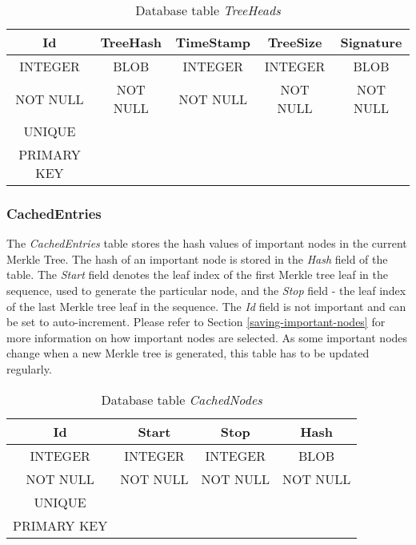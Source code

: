 \documentclass{article}
\begin{document}
	\begin{table}[H]
		\centering
		\caption{Database table \textit{TreeHeads}}
		\label{treeHeadsDbTable1}
		\begin{tabular}{|c|c|c|c|c|} \hline
			\textbf{Id}	& \textbf{TreeHash}  & \textbf{TimeStamp} & \textbf{TreeSize} & \textbf{Signature} \\ \hline
			INTEGER & BLOB & INTEGER & INTEGER & BLOB \\ \hline
			NOT NULL & NOT NULL & NOT NULL & NOT NULL & NOT NULL \\
			UNIQUE & & & & \\
			PRIMARY KEY & & & & \\ \hline
		\end{tabular}
	\end{table}

	\subsubsection{CachedEntries}
	
	The \textit{CachedEntries} table stores the hash values of important nodes in the current Merkle Tree. The hash of an important node is stored in the \textit{Hash} field of the table. The \textit{Start} field denotes the leaf index of the first Merkle tree leaf in the sequence, used to generate the particular node, and the \textit{Stop} field - the leaf index of the last Merkle tree leaf in the sequence. The \textit{Id} field is not important and can be set to auto-increment. Please refer to Section \ref{saving-important-nodes} for more information on how important nodes are selected. As some important nodes change when a new Merkle tree is generated, this table has to be updated regularly.

	\begin{table}[H]
		\centering
		\caption{Database table \textit{CachedNodes}}
		\label{cachedNodesDbTable1}
		\begin{tabular}{|c|c|c|c|} \hline
			\textbf{Id}	& \textbf{Start}  & \textbf{Stop} & \textbf{Hash} \\ \hline
			INTEGER & INTEGER & INTEGER & BLOB \\  \hline
			NOT NULL & NOT NULL & NOT NULL & NOT NULL \\
			UNIQUE &&& \\
			PRIMARY KEY &&& \\ \hline
		\end{tabular}
	\end{table}
\end{document}
